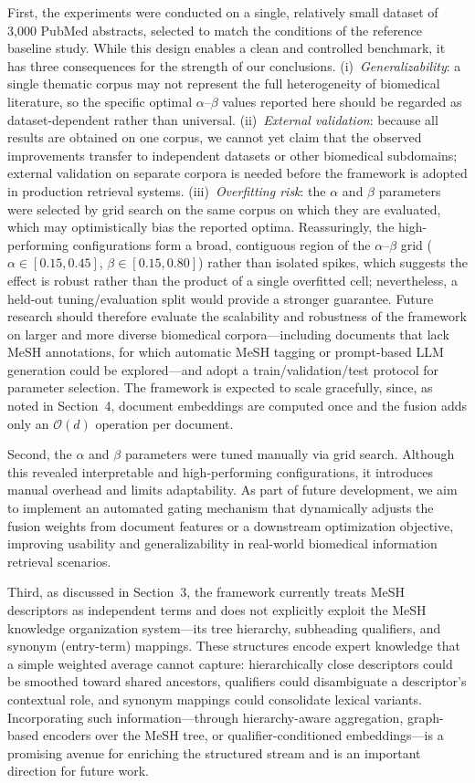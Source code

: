 \documentclass[authorproof,JACIII,researchpaper]{fujipressarticle}
\begin{document}
First, the experiments were conducted on a single, relatively small dataset of 3{,}000 PubMed abstracts, selected to match the conditions of the reference baseline study. While this design enables a clean and controlled benchmark, it has three consequences for the strength of our conclusions. (i)~\textit{Generalizability}: a single thematic corpus may not represent the full heterogeneity of biomedical literature, so the specific optimal $\alpha$--$\beta$ values reported here should be regarded as dataset-dependent rather than universal. (ii)~\textit{External validation}: because all results are obtained on one corpus, we cannot yet claim that the observed improvements transfer to independent datasets or other biomedical subdomains; external validation on separate corpora is needed before the framework is adopted in production retrieval systems. (iii)~\textit{Overfitting risk}: the $\alpha$ and $\beta$ parameters were selected by grid search on the same corpus on which they are evaluated, which may optimistically bias the reported optima. Reassuringly, the high-performing configurations form a broad, contiguous region of the $\alpha$--$\beta$ grid ($\alpha \in [0.15, 0.45]$, $\beta \in [0.15, 0.80]$) rather than isolated spikes, which suggests the effect is robust rather than the product of a single overfitted cell; nevertheless, a held-out tuning/evaluation split would provide a stronger guarantee. Future research should therefore evaluate the scalability and robustness of the framework on larger and more diverse biomedical corpora---including documents that lack MeSH annotations, for which automatic MeSH tagging or prompt-based LLM generation could be explored---and adopt a train/validation/test protocol for parameter selection. The framework is expected to scale gracefully, since, as noted in Section~4, document embeddings are computed once and the fusion adds only an $\mathcal{O}(d)$ operation per document.

Second, the $\alpha$ and $\beta$ parameters were tuned manually via grid search. Although this revealed interpretable and high-performing configurations, it introduces manual overhead and limits adaptability. As part of future development, we aim to implement an automated gating mechanism that dynamically adjusts the fusion weights from document features or a downstream optimization objective, improving usability and generalizability in real-world biomedical information retrieval scenarios.

Third, as discussed in Section~3, the framework currently treats MeSH descriptors as independent terms and does not explicitly exploit the MeSH knowledge organization system---its tree hierarchy, subheading qualifiers, and synonym (entry-term) mappings. These structures encode expert knowledge that a simple weighted average cannot capture: hierarchically close descriptors could be smoothed toward shared ancestors, qualifiers could disambiguate a descriptor's contextual role, and synonym mappings could consolidate lexical variants. Incorporating such information---through hierarchy-aware aggregation, graph-based encoders over the MeSH tree, or qualifier-conditioned embeddings---is a promising avenue for enriching the structured stream and is an important direction for future work.
\end{document}
